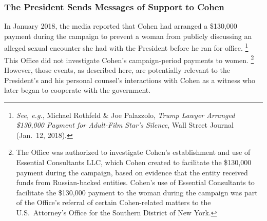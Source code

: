 \subsubsection{The President Sends Messages of Support to Cohen}

In January 2018, the media reported that Cohen had arranged a \$130,000 payment during the campaign to prevent a woman from publicly discussing an alleged sexual encounter she had with the President before he ran for office.%
\footnote{\textit{See, e.g.}, Michael Rothfeld \& Joe Palazzolo, \textit{Trump Lawyer Arranged \$130,000 Payment for Adult-Film Star's Silence}, Wall Street Journal (Jan.~12, 2018).}
This Office did not investigate Cohen's campaign-period payments to women.%
\footnote{The Office was authorized to investigate Cohen's establishment and use of Essential Consultants LLC, which Cohen created to facilitate the \$130,000 payment during the campaign, based on evidence that the entity received funds from Russian-backed entities.
Cohen's use of Essential Consultants to facilitate the \$130,000 payment to the woman during the campaign was part of the Office's referral of certain Cohen-related matters to the U.S.~Attorney's Office for the Southern District of New York.}
However, those events, as described here, are potentially relevant to the President's and his personal counsel's interactions with Cohen as a witness who later began to cooperate with the government.

